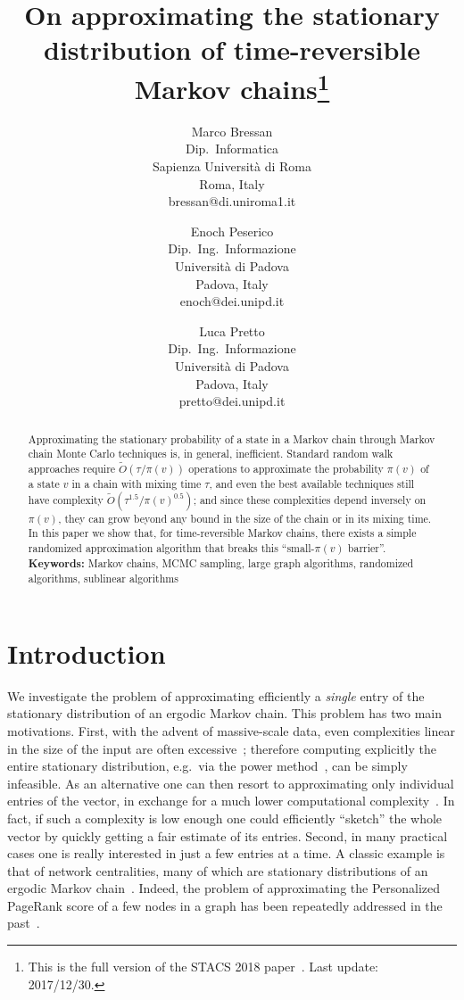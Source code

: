 \documentclass[a4paper,11pt]{article}
\title{\textbf{On approximating the stationary distribution of time-reversible Markov chains}\footnote{This is the full version of the STACS 2018 paper~\cite{Bressan&2018}. Last update: 2017/12/30.}}
\author{
{\mysize Marco Bressan}\\
{\mysize Dip.\ Informatica}\\
{\mysize Sapienza Universit\`a di Roma}\\
{\mysize Roma, Italy}\\
{\mysize bressan@di.uniroma1.it}
\and
{\mysize Enoch Peserico}\\
{\mysize Dip.\ Ing.\ Informazione}\\
{\mysize Universit\`a di Padova}\\
{\mysize Padova, Italy}\\
{\mysize enoch@dei.unipd.it}
\and
{\mysize Luca Pretto}\\
{\mysize Dip.\ Ing.\ Informazione}\\
{\mysize Universit\`a di Padova}\\
{\mysize Padova, Italy}\\
{\mysize pretto@dei.unipd.it}
}
\date{}
\begin{document}
\maketitle

\begin{abstract}
Approximating the stationary probability of a state in a Markov chain through Markov chain Monte Carlo techniques is, in general, inefficient. 
Standard random walk approaches require $\tilde{O}(\tau/\pi(v))$ operations to approximate the probability $\pi(v)$ of a state $v$ in a chain with mixing time $\tau$, and even the best available techniques still have complexity $\tilde{O}(\tau^{1.5}/\pi(v)^{0.5})$; and since these complexities depend inversely on $\pi(v)$, they can grow beyond any bound in the size of the chain or in its mixing time.
In this paper we show that, for time-reversible Markov chains, there exists a simple randomized approximation algorithm that breaks this ``small-$\pi(v)$ barrier''.
\\[.01\textheight]
\textbf{Keywords:}
Markov chains, MCMC sampling, large graph algorithms, randomized algorithms, sublinear algorithms
\end{abstract}


\section{Introduction}
\label{sec:intro}
We investigate the problem of approximating efficiently a \textit{single} entry of the stationary distribution of an ergodic Markov chain.
This problem has two main motivations.
First, with the advent of massive-scale data, even complexities linear in the size of the input are often excessive~\cite{Rubinfeld&2011}; therefore computing explicitly the entire stationary distribution, e.g.\ via the power method~\cite{golub2012matrix}, can be simply infeasible.
As an alternative one can then resort to approximating only individual entries of the vector, in exchange for a much lower computational complexity~\cite{Lee&2014,Shyamkumar&}.
In fact, if such a complexity is low enough one could efficiently ``sketch'' the whole vector by quickly getting a fair estimate of its entries.
Second, in many practical cases one is really interested in just a few entries at a time.
A classic example is that of network centralities, many of which are stationary distributions of an ergodic Markov chain~\cite{Bonacich&2001}.
Indeed, the problem of approximating the Personalized PageRank score of a few nodes in a graph has been repeatedly addressed in the past~\cite{Borgs&2012,Borgs&2014,Lofgren&2014b,Lofgren&2015}.
\end{document}
